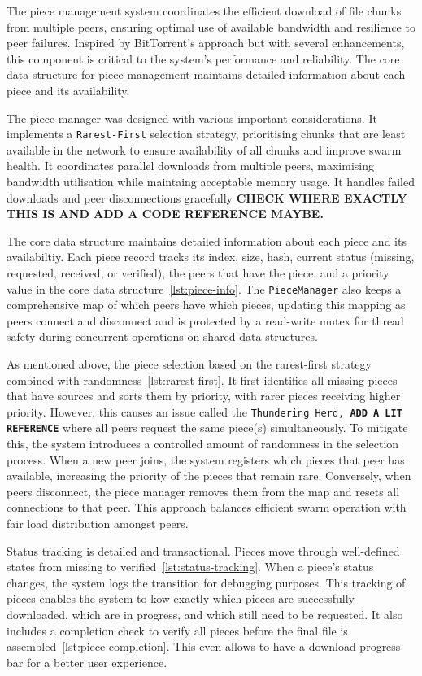 \documentclass[12pt,a4paper]{report}
\begin{document}
The piece management system coordinates the efficient download of file chunks from multiple peers, ensuring optimal use of available bandwidth and resilience to peer failures. Inspired by BitTorrent's approach but with several enhancements, this component is critical to the system's performance and reliability. The core data structure for piece management maintains detailed information about each piece and its availability.

The piece manager was designed with various important considerations. It implements a \texttt{Rarest-First} selection strategy, prioritising chunks that are least available in the network to ensure availability of all chunks and improve swarm health. It coordinates parallel downloads from multiple peers, maximising bandwidth utilisation while maintaing acceptable memory usage. It handles failed downloads and peer disconnections gracefully \textbf{CHECK WHERE EXACTLY THIS IS AND ADD A CODE REFERENCE MAYBE.}

The core data structure maintains detailed information about each piece and its availabiltiy. Each piece record tracks its index, size, hash, current status (missing, requested, received, or verified), the peers that have the piece, and a priority value in the core data structure~\ref{lst:piece-info}. The \texttt{PieceManager} also keeps a comprehensive map of which peers have which pieces, updating this mapping as peers connect and disconnect and is protected by a read-write mutex for thread safety during concurrent operations on shared data structures.

As mentioned above, the piece selection based on the rarest-first strategy combined with randomness~\ref{lst:rarest-first}. It first identifies all missing pieces that have sources and sorts them by priority, with rarer pieces receiving higher priority. However, this causes an issue called the \texttt{Thundering Herd, \textbf{ADD A LIT REFERENCE}} where all peers request the same piece(s) simultaneously. To mitigate this, the system introduces a controlled amount of randomness in the selection process. When a new peer joins, the system registers which pieces that peer has available, increasing the priority of the pieces that remain rare. Conversely, when peers disconnect, the piece manager removes them from the map and resets all connections to that peer. This approach balances efficient swarm operation with fair load distribution amongst peers.

Status tracking is detailed and transactional. Pieces move through well-defined states from missing to verified~\ref{lst:status-tracking}. When a piece's status changes, the system logs the transition for debugging purposes. This tracking of pieces enables the system to kow exactly which pieces are successfully downloaded, which are in progress, and which still need to be requested. It also includes a completion check to verify all pieces before the final file is assembled~\ref{lst:piece-completion}. This even allows to have a download progress bar for a better user experience.
\end{document}
